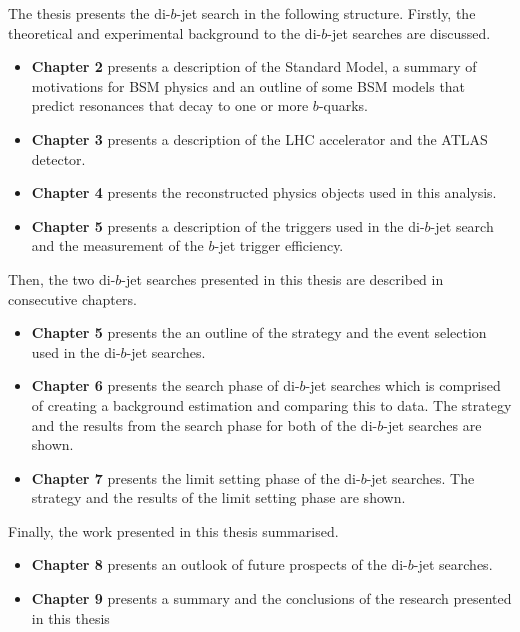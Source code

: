 \noindent
The thesis presents the di-$b$-jet search in the following structure.
Firstly, the theoretical and experimental background to the di-$b$-jet searches are discussed.
\begin{itemize}[leftmargin=*]
\item\textbf{Chapter 2} presents a description of the Standard Model,
  a summary of motivations for BSM physics and
  an outline of some BSM models that predict resonances
  that decay to one or more $b$-quarks.\vspace{0.5em}
\item\textbf{Chapter 3} presents a description of the LHC accelerator and the ATLAS detector.\vspace{0.5em}
\item\textbf{Chapter 4} presents the reconstructed physics objects used in this analysis. \vspace{0.5em}
\item\textbf{Chapter 5} presents a description of the triggers used in the di-$b$-jet search
  and the measurement of the $b$-jet trigger efficiency. \vspace{0.5em}
\end{itemize}
\noindent
Then, the two di-$b$-jet searches presented in this thesis are described in consecutive chapters.
\begin{itemize}[leftmargin=*]
\item\textbf{Chapter 5} presents the an outline of the strategy and the event selection used in the \mbox{di-$b$-jet} searches.\vspace{0.5em}
\item\textbf{Chapter 6} presents the search phase of di-$b$-jet searches
  which is comprised of creating a background estimation and comparing this to data.
  The strategy and the results from the search phase for both of the di-$b$-jet searches are shown.\vspace{0.5em}
\item\textbf{Chapter 7} presents the limit setting phase of the di-$b$-jet searches.
  The strategy and the results of the limit setting phase are shown.\vspace{0.5em}
\end{itemize}
\noindent
  Finally, the work presented in this thesis summarised.
  \begin{itemize}[leftmargin=*]
\item\textbf{Chapter 8} presents an outlook of future prospects of the di-$b$-jet searches.\vspace{0.5em}
\item\textbf{Chapter 9} presents a summary and the conclusions of the research presented in this thesis\vspace{0.5em}
\end{itemize}
\clearpage
